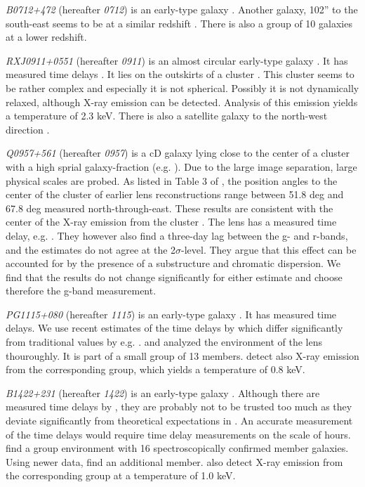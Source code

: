 \documentclass[useAMS,usenatbib]{mn2e}
\begin{document}
\textit{B0712+472} (hereafter \textit{0712}) is an early-type galaxy \citep{1998AJ....115..377F}. Another galaxy, 102'' to the south-east seems to be at a similar redshift \citep{2002AJ....123..627F}. There is also a group of 10 galaxies at a lower redshift.

\textit{RXJ0911+0551} (hereafter \textit{0911}) is an almost circular early-type galaxy \citep{2012A&A...538A..99S}. It has measured time delays \citep{2002ApJ...572L..11H}. It lies on the outskirts of a cluster \citep{2001ApJ...555....1M}. This cluster seems to be rather complex and especially it is not spherical. Possibly it is not dynamically relaxed, although X-ray emission can be detected. Analysis of this emission yields a temperature of 2.3 keV. There is also a satellite galaxy to the north-west direction \citep{2000ApJ...544L..35K}.

\textit{Q0957+561} (hereafter \textit{0957}) is a cD galaxy lying close to the center of a cluster with a high sprial galaxy-fraction (e.g. \cite{1992MNRAS.254P..27G,1994A&A...291..411A,1998ApJ...504..661C}). Due to the large image separation, large physical scales are probed. As listed in Table 3 of \cite{2000ApJ...542...74K}, the position angles to the center of the cluster of earlier lens reconstructions range between 51.8 deg and 67.8 deg measured north-through-east. These results are consistent with the center of the X-ray emission from the cluster \citep{1998ApJ...504..661C}. The lens has a measured time delay, e.g. \citep{2012A&A...540A.132S}. They however also find a three-day lag between the g- and r-bands, and the estimates do not agree at the 2$\sigma$-level. They argue that this effect can be accounted for by the presence of a substructure and chromatic dispersion. We find that the results do not change significantly for either estimate and choose therefore the g-band measurement.

\textit{PG1115+080} (hereafter \textit{1115}) is an early-type galaxy \citep{2005ApJ...626...51Y}. It has measured time delays. We use recent estimates of the time delays by \cite{2010MNRAS.406.2764T} which differ significantly from traditional values by e.g. \cite{1997ApJ...489...21B}. \cite{2006ApJ...641..169M} and \cite{2011ApJ...726...84W} analyzed the environment of the lens thouroughly. It is part of a small group of 13 members. \cite{2004ApJ...610..686G} detect also X-ray emission from the corresponding group, which yields a temperature of 0.8 keV.

\textit{B1422+231} (hereafter \textit{1422}) is an early-type galaxy \citep{1996ApJ...462L..53I}. Although there are measured time delays by \cite{2001MNRAS.326.1403P}, they are probably not to be trusted too much as they deviate significantly from theoretical expectations in \cite{2003AJ....126...29R}. An accurate measurement of the time delays would require time delay measurements on the scale of hours. \cite{2006ApJ...641..169M} find a group environment with 16 spectroscopically confirmed member galaxies. Using newer data, \cite{2011ApJ...726...84W} find an additional member. \cite{2004ApJ...610..686G} also detect X-ray emission from the corresponding group at a temperature of 1.0 keV.
\end{document}
